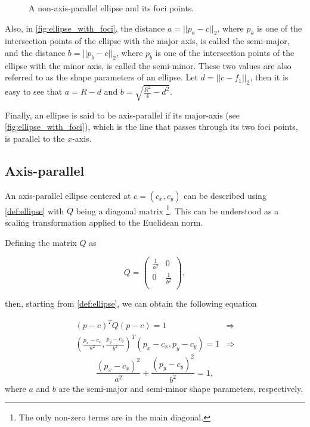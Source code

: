 \begin{figure}[H]
    \centering
    
    \caption{A non-axis-parallel ellipse and its foci points.}
    
    \fautor
    \label{fig:ellipse_with_foci}
\end{figure}

Also, in \autoref{fig:ellipse_with_foci}, the distance $a = ||p_a - c||_2$, where $p_a$ is one of the intersection points of the ellipse with the major axis, is called the semi-major, and the distance $b = ||p_b-c||_2$, where $p_b$ is one of the intersection points of the ellipse with the minor axis, is called the semi-minor. These two values are also referred to as the shape parameters of an ellipse. Let $d = ||c-f_1||_2$, then it is easy to see that $a = R - d$ and $b = \sqrt{\frac{R^2}{4} - d^2}$.

Finally, an ellipse is said to be axis-parallel if its major-axis (see \autoref{fig:ellipse_with_foci}), which is the line that passes through its two foci points, is parallel to the $x$-axis.

\subsection{Axis-parallel}

An axis-parallel ellipse centered at $c = (c_x,c_y)$ can be described using \autoref{def:ellipse} with $Q$ being a diagonal matrix \footnote{The only non-zero terms are in the main diagonal.}. This can be understood as a scaling transformation applied to the Euclidean norm.

Defining the matrix $Q$ as

\[
Q=
\left( {\begin{array}{cc}
    \frac{1}{a^2} & 0 \\
    0 & \frac{1}{b^2} \\
    \end{array} } \right),
\]

\noindent then, starting from \autoref{def:ellipse}, we can obtain the following equation

\begin{align*}
        (p-c)^{T}Q(p-c) = 1 & \Rightarrow \\
    (\frac{p_x-c_x}{a^2}, \frac{p_y-c_y}{b^2})^{T}(p_x-c_x, p_y-c_y) = 1 & \Rightarrow
 \end{align*}
 \begin{equation}\label{equation:pellipse}
  \frac{(p_x-c_x)^2}{a^2} + \frac{(p_y-c_y)^2}{b^2} = 1,
 \end{equation}
where $a$ and $b$ are the semi-major and semi-minor shape parameters, respectively.

